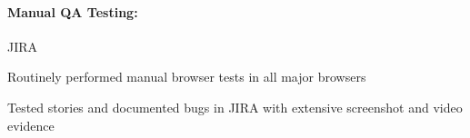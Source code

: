 \begin{position}
  \paragraph{Manual QA Testing:} JIRA
  \begin{myitem}
  \item Routinely performed manual browser tests in all major browsers
  \item Tested stories and documented bugs in JIRA with extensive screenshot and video evidence
  \end{myitem}
\end{position}
